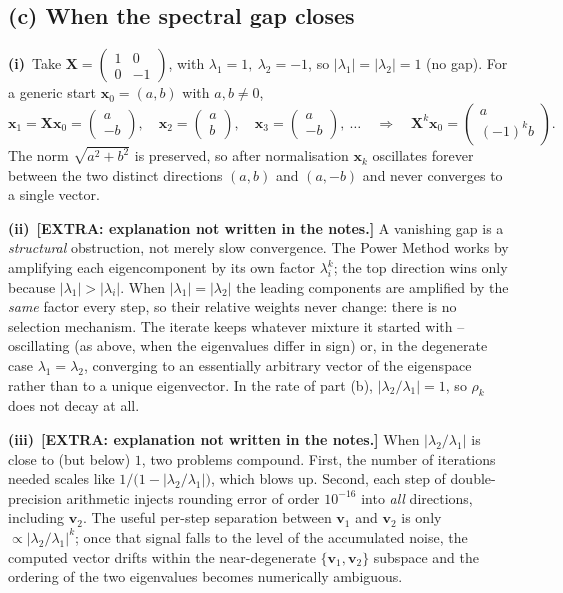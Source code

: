 \documentclass[12pt,a4paper]{article}
\newcommand{\extra}[1]{{\textbf{\textcolor{blue!80!black}{[EXTRA: #1]}}}}
\theoremstyle{definition}
\newcommand{\Xb}{\mathbf{X}}
\newcommand{\vv}{\mathbf{v}}
\newcommand{\xx}{\mathbf{x}}
\begin{document}
\subsection{(c) When the spectral gap closes}

\textbf{(i)}~Take $\displaystyle \Xb=\begin{pmatrix}1&0\\0&-1\end{pmatrix}$,
with $\lambda_1=1,\ \lambda_2=-1$, so $|\lambda_1|=|\lambda_2|=1$ (no gap).
For a generic start $\xx_0=(a,b)$ with $a,b\ne0$,
\[
\xx_1=\Xb\xx_0=\begin{pmatrix}a\\-b\end{pmatrix},\quad
\xx_2=\begin{pmatrix}a\\ b\end{pmatrix},\quad
\xx_3=\begin{pmatrix}a\\-b\end{pmatrix},\ \dots
\quad\Longrightarrow\quad
\Xb^{k}\xx_0=\begin{pmatrix}a\\ (-1)^{k}b\end{pmatrix}.
\]
The norm $\sqrt{a^2+b^2}$ is preserved, so after normalisation $\xx_k$
oscillates forever between the two distinct directions
$(a,b)$ and $(a,-b)$ and never converges to a single vector.

\textbf{(ii)}~\extra{explanation not written in the notes.} A vanishing gap is
a \emph{structural} obstruction, not merely slow convergence. The Power Method
works by amplifying each eigencomponent by its own factor $\lambda_i^{k}$; the
top direction wins only because $|\lambda_1|>|\lambda_i|$. When
$|\lambda_1|=|\lambda_2|$ the leading components are amplified by the
\emph{same} factor every step, so their relative weights never change: there is
no selection mechanism. The iterate keeps whatever mixture it started with --
oscillating (as above, when the eigenvalues differ in sign) or, in the
degenerate case $\lambda_1=\lambda_2$, converging to an essentially arbitrary
vector of the eigenspace rather than to a unique eigenvector. In the rate of
part (b), $|\lambda_2/\lambda_1|=1$, so $\rho_k$ does not decay at all.

\textbf{(iii)}~\extra{explanation not written in the notes.} When
$|\lambda_2/\lambda_1|$ is close to (but below) $1$, two problems compound.
First, the number of iterations needed scales like
$1/\bigl(1-|\lambda_2/\lambda_1|\bigr)$, which blows up. Second, each step of
double-precision arithmetic injects rounding error of order $10^{-16}$ into
\emph{all} directions, including $\vv_2$. The useful per-step separation
between $\vv_1$ and $\vv_2$ is only $\propto |\lambda_2/\lambda_1|^{k}$; once that
signal falls to the level of the accumulated noise, the computed vector drifts
within the near-degenerate $\{\vv_1,\vv_2\}$ subspace and the ordering of the
two eigenvalues becomes numerically ambiguous.
\end{document}
